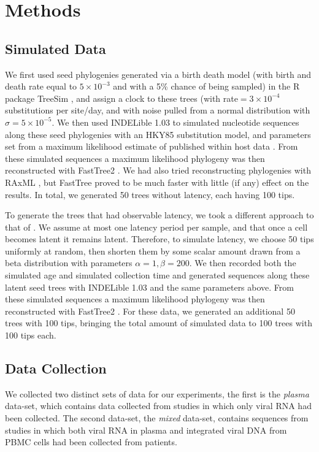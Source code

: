 \section{Methods} \label{sec:methods}
\subsection{Simulated Data} \label{subsec:simdata}
We first used seed phylogenies generated via a birth death model (with birth and death rate equal to $5\times 10^{-3}$ and with a 5\% chance of being sampled) in the R package TreeSim \citep{TreeSim, Stradler13, Boskova14}, and assign a clock to these trees (with rate$=3\times 10^{-4}$ substitutions per site/day, and with noise pulled from a normal distribution with $\sigma=5\times 10^{-5}$.
We then used INDELible 1.03 \citep{Indelible09} to simulated nucleotide sequences along these seed phylogenies with an HKY85 \citep{HKY85} substitution model, and  parameters set from a maximum likelihood estimate of published within host data \citep{McCloskey14}. 
From these simulated sequences a maximum likelihood phylogeny was then reconstructed with FastTree2 \citep{FastTree10}.
We had also tried reconstructing phylogenies with RAxML \citep{Raxml14}, but FastTree proved to be much faster with little (if any) effect on the results. 
In total, we generated 50 trees without latency, each having 100 tips. 

To generate the trees that had observable latency, we took a different approach to that of \cite{Immonen14}. 
We assume at most one latency period per sample, and that once a cell becomes latent it remains latent. 
Therefore, to simulate latency, we choose 50 tips uniformly at random, then shorten them by some scalar amount drawn from a beta distribution with parameters $\alpha=1, \beta=200$.
We then recorded both the simulated age and simulated collection time and generated sequences along these latent seed trees with INDELible 1.03 \citep{Indelible09} and the same parameters above. 
From these simulated sequences a maximum likelihood phylogeny was then reconstructed with FastTree2 \citep{FastTree10}.
For these data, we generated an additional 50 trees with 100 tips, bringing the total amount of simulated data to 100 trees with 100 tips each. 


\subsection{Data Collection} \label{subsec:dcollection}
We collected two distinct sets of data for our experiments, the first is the {\em plasma} data-set, which contains data collected from studies in which only viral RNA had been collected. 
The second data-set, the {\em mixed} data-set, contains sequences from studies in which both viral RNA in plasma and integrated viral DNA from PBMC cells had been collected from patients.

